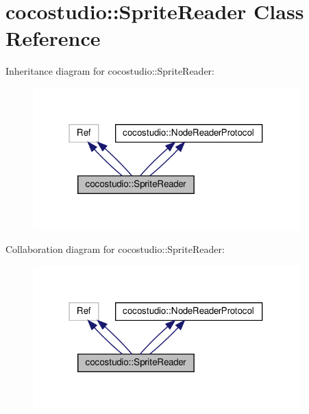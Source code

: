 \hypertarget{classcocostudio_1_1SpriteReader}{}\section{cocostudio\+:\+:Sprite\+Reader Class Reference}
\label{classcocostudio_1_1SpriteReader}


Inheritance diagram for cocostudio\+:\+:Sprite\+Reader\+:
\nopagebreak
\begin{figure}[H]
\begin{center}
\leavevmode
\includegraphics[width=292pt]{classcocostudio_1_1SpriteReader__inherit__graph}
\end{center}
\end{figure}


Collaboration diagram for cocostudio\+:\+:Sprite\+Reader\+:
\nopagebreak
\begin{figure}[H]
\begin{center}
\leavevmode
\includegraphics[width=292pt]{classcocostudio_1_1SpriteReader__coll__graph}
\end{center}
\end{figure}
